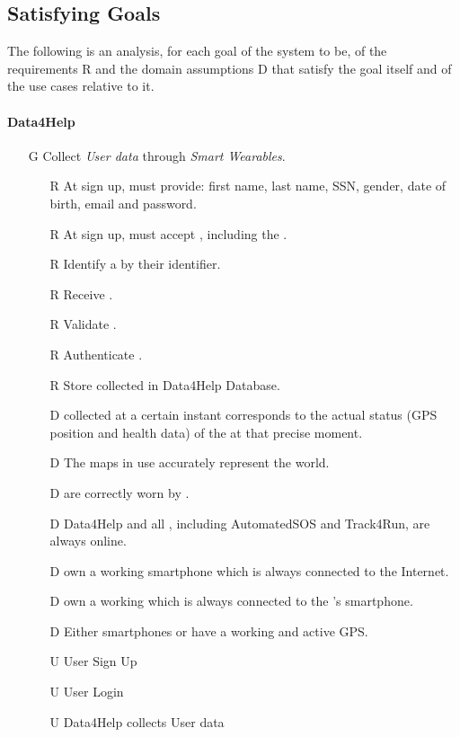 \documentclass[../../../rasd.tex]{subfiles}
\begin{document}
\subsection{Satisfying Goals}
The following is an analysis, for each goal of the system to be, of the requirements R and the domain assumptions D that satisfy the goal itself and of the use cases relative to it.
\paragraph{Data4Help}
\begin{itemize}

	\item[G\subs{1}]Collect \textit{User data} through \textit{Smart Wearables}.
	\begin{itemize}
		\item[R\subs{2}]At sign up,  must provide: first name, last name, SSN, gender, date of birth, email and password.
		\item[R\subs{4}]At sign up,  must accept , including the .
		\item[R\subs{6}]Identify a  by their identifier.
		\item[R\subs{8}]Receive .
		\item[R\subs{9}]Validate .
		\item[R\subs{10}]Authenticate .
		\item[R\subs{11}]Store collected  in Data4Help Database.
		\\
		\item[D\subs{2}] collected at a certain instant corresponds to the actual status (GPS position and health data) of the  at that precise moment.              
		\item[D\subs{3}]The maps in use accurately represent the world.
		\item[D\subs{8}] are correctly worn by .
		\item[D\subs{9}]Data4Help and all , including AutomatedSOS and Track4Run, are always online.
		\item[D\subs{10}] own a working smartphone which is always connected to the Internet.
		\item[D\subs{11}] own a working  which is always connected to the 's smartphone.
		\item[D\subs{12}]Either smartphones or  have a working and active GPS.
		\\
		\item[U\subs{1}]User Sign Up
		\item[U\subs{3}]User Login
		\item[U\subs{5}]Data4Help collects User data


\end{itemize}
\end{itemize}
\end{document}
